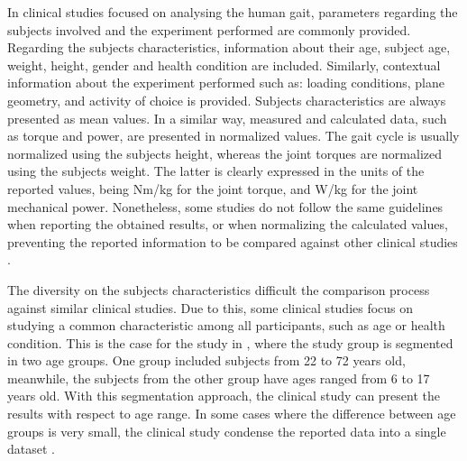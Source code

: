 In clinical studies focused on analysing the human gait, parameters regarding the subjects involved and the experiment performed are commonly provided. Regarding the subjects characteristics, information about their age, subject age, weight, height, gender and health condition are included. Similarly, contextual information about the experiment performed such as: loading conditions, plane geometry, and activity of choice is provided. Subjects characteristics are always presented as mean values. In a similar way, measured and calculated data, such as torque and power, are presented in normalized values. The gait cycle is usually normalized using the subjects height, whereas the joint torques are normalized using the subjects weight. The latter is clearly expressed in the units of the reported values, being Nm/kg for the joint torque, and W/kg for the joint mechanical power. Nonetheless, some studies do not follow the same guidelines when reporting the obtained results, or when normalizing the calculated values, preventing the reported information to be compared against other clinical studies \cite{lee2008biomechanics}. 

The diversity on the subjects characteristics difficult the comparison process against similar clinical studies. Due to this, some clinical studies focus on studying a common characteristic among all participants, such as age or health condition. This is the case for the study in \cite{bovi2011multiple}, where the study group is segmented in two age groups. One group included subjects from 22 to 72 years old, meanwhile, the subjects from the other group have ages ranged from 6 to 17 years old. With this segmentation approach, the clinical study can present the results with respect to age range. In some cases where the difference between age groups is very small, the clinical study condense the reported data into a single dataset \cite{lee2008biomechanics}.

